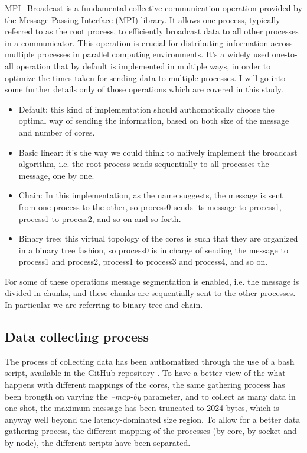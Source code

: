 \documentclass{article}
\begin{document}
	MPI\_Broadcast is a fundamental collective communication operation provided by the Message Passing Interface (MPI) library. It allows one process, typically referred to as the root process, to efficiently broadcast data to all other processes in a communicator. This operation is crucial for distributing information across multiple processes in parallel computing environments. It's a widely used one-to-all operation that by default is implemented in multiple ways, in order to optimize the times taken for sending data to multiple processes.
	I will go into some further details only of those operations which are covered in this study.
	\begin{itemize}
		\item Default: this kind of implementation should authomatically choose the optimal way of sending the information, based on both size of the message and number of cores.\\
		\item Basic linear: it's the way we could think to naiively implement the broadcast algorithm, i.e. the root process sends sequentially to all processes the message, one by one.\\
		\item Chain: In this implementation, as the name suggests, the message is sent from one process to the other, so process0 sends its message to process1, process1 to process2, and so on and so forth.\\
		\item Binary tree: this virtual topology of the cores is such that they are organized in a binary tree fashion, so process0 is in charge of sending the message to process1 and process2, process1 to process3 and process4, and so on.
	\end{itemize}
	
	For some of these operations message segmentation is enabled, i.e. the message is divided in chunks, and these chunks are sequentially sent to the other processes. In particular we are referring to binary tree and chain.
	
	\subsection{Data collecting process}
	The process of collecting data has been authomatized through the use of a bash script, available in the GitHub repository \cite{repo}. 
	To have a better view of the what happens with different mappings of the cores, the same gathering process has been brougth on varying the \textit{--map-by} parameter, and to collect as many data in one shot, the maximum message has been truncated to 2024 bytes, which is anyway well beyond the latency-dominated size region.
	To allow for a better data gathering process, the different mapping of the processes (by core, by socket and by node), the different scripts have been separated.
	
\end{document}
